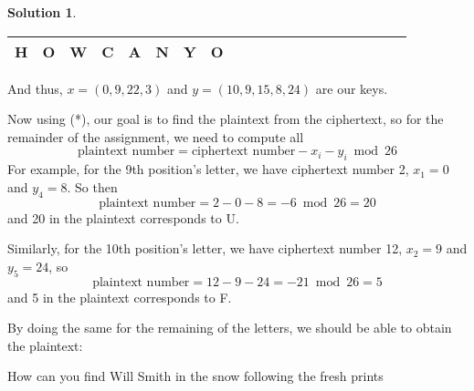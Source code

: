 \documentclass[11pt]{article}
\theoremstyle{definition}\newtheorem{definition}{Definition}
\theoremstyle{definition}\newtheorem{question}{Question}
\theoremstyle{definition}\newtheorem*{solution}{Solution}
\begin{document}
\begin{solution}
\begin{center}
\begin{tabular}{|cccccccccccccccccccc|}
                H     & O     & W     & C                          & \multicolumn{1}{c|}{A}     & N     & Y     & \multicolumn{1}{c|}{O}     &       &                            &       &                            &       &       &                            &                            &       &       &       &       \\ \hline
                \end{tabular}
            \end{center}
    And thus, $x = (0, 9, 22, 3)$ and $y = (10, 9, 15, 8, 24)$ are our keys.

    Now using (*), our goal is to find the plaintext from the ciphertext, so for the remainder of the assignment, we need to compute all
    \begin{equation*}
        \text{plaintext number} = \text{ciphertext number} - x_i - y_i \bmod {26}
    \end{equation*}
    For example, for the 9th position's letter, we have ciphertext number 2, $x_1 = 0$ and $y_4 = 8$. So then
    \begin{equation*}
        \text{plaintext number} = 2 - 0 - 8 = -6 \bmod {26} = 20
    \end{equation*}
    and 20 in the plaintext corresponds to U.

    Similarly, for the 10th position's letter, we have ciphertext number 12, $x_2 = 9$ and $y_5 = 24$, so
    \begin{equation*}
        \text{plaintext number} = 12 - 9 - 24 = -21 \bmod {26} = 5
    \end{equation*}
    and 5 in the plaintext corresponds to F.

    By doing the same for the remaining of the letters, we should be able to obtain the plaintext:
    \begin{center}
        \textsf{How can you find Will Smith in the snow following the fresh prints}
    \end{center}
\end{solution}
\end{document}

